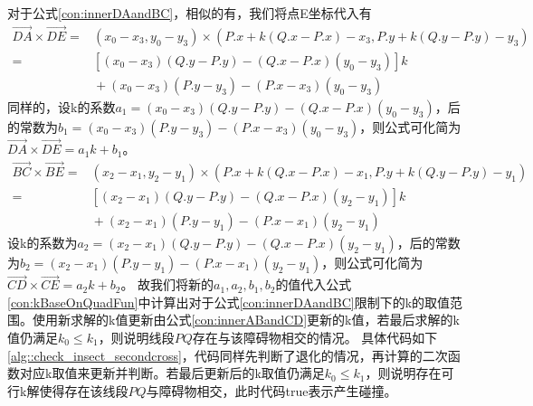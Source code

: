 \par 对于公式\ref{con:innerDAandBC}，相似的有，我们将点E坐标代入有
\begin{align*} 
    \vec{DA}\times\vec{DE} = {}& (x_0-x_3,y_0-y_3)\times(P.x+k(Q.x-P.x)-x_3,P.y+k(Q.y-P.y)-y_3) \\ 
    = {}& [(x_0-x_3)(Q.y-P.y)-(Q.x-P.x)(y_0-y_3)]k  \\ 
    &{} +(x_0-x_3)(P.y-y_3)-(P.x-x_3)(y_0-y_3) 
\end{align*}
同样的，设k的系数$a_1=(x_0-x_3)(Q.y-P.y)-(Q.x-P.x)(y_0-y_3)$，后的常数为$b_1=(x_0-x_3)(P.y-y_3)-(P.x-x_3)(y_0-y_3)$，则公式可化简为$\vec{DA}\times\vec{DE} = a_1k+b_1$。
\begin{align*} 
    \vec{BC}\times\vec{BE} = {}& (x_2-x_1,y_2-y_1)\times(P.x+k(Q.x-P.x)-x_1,P.y+k(Q.y-P.y)-y_1) \\ 
    = {}& [(x_2-x_1)(Q.y-P.y)-(Q.x-P.x)(y_2-y_1)]k  \\ 
    &{} +(x_2-x_1)(P.y-y_1)-(P.x-x_1)(y_2-y_1) 
\end{align*}
设k的系数为$a_2=(x_2-x_1)(Q.y-P.y)-(Q.x-P.x)(y_2-y_1)$，后的常数为$b_2=(x_2-x_1)(P.y-y_1)-(P.x-x_1)(y_2-y_1)$，则公式可化简为$\vec{CD}\times\vec{CE} = a_2k+b_2$。
故我们将新的$a_1,a_2,b_1,b_2$的值代入公式\ref{con:kBaseOnQuadFun}中计算出对于公式\ref{con:innerDAandBC}限制下的k的取值范围。使用新求解的k值更新由公式\ref{con:innerABandCD}更新的k值，若最后求解的k值仍满足$k_0\leq k_1$，则说明线段$PQ$存在与该障碍物相交的情况。
具体代码如下\ref{alg::check_insect_secondcross}，代码同样先判断了退化的情况，再计算的二次函数对应k取值来更新并判断。若最后更新后的k取值仍满足$k_0\leq k_1$，则说明存在可行k解使得存在该线段$PQ$与障碍物相交，此时代码true表示产生碰撞。
%
